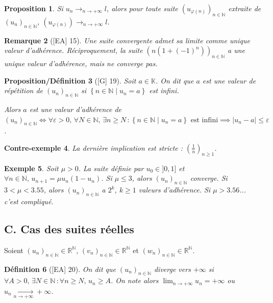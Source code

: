 \documentclass[10pt, a4paper, parskip=full, twoside, twocolumn]{report}
\newtheorem{definition}{Définition}
\newtheorem{proposition}[definition]{Proposition}
\newtheorem{proposition_def}[definition]{Proposition/Définition}
\newtheorem{example}[definition]{Exemple}
\newtheorem{cexample}[definition]{Contre-exemple}
\newtheorem{remark}[definition]{Remarque}
\newcommand{\IN}{\mathbb{N}}
\newcommand{\IK}{\mathbb{K}}
\newcommand{\IR}{\mathbb{R}}
\begin{document}
\begin{proposition}
	Si $u_n\longrightarrow_{n\to +\infty} l$, alors pour toute suite $\left(u_{\varphi(n)}\right)_{n\in\IN}$ extraite de $\left(u_n\right)_{n\in\IN}$, $\left(u_{\varphi(n)}\right)\longrightarrow_{n\to +\infty} l$.
\end{proposition}

\begin{remark}[\textnormal{[EA] 15}]
	Une suite convergente admet sa limite comme unique valeur d'adhérence. Réciproquement,
	la suite $\left(n(1+(-1)^n)\right)_{n\in\IN}$ a une unique valeur d'adhérence, mais ne converge pas.
\end{remark}

\begin{proposition_def}[\textnormal{[G] 19}]
	Soit $a\in\IK$. On dit que $a$ est \emph{une valeur de répétition de $\left(u_n\right)_{n\in \IN}$} si $\left\{n\in \IN \mid u_n = a\right\}$ est infini.
	
	Alors $a$ est une valeur d'adhérence de $\left(u_n\right)_{n\in\IN}\iff \forall \varepsilon > 0,\,\forall N\in\IN,\, \exists n\geq N\,\colon \left\{n\in\IN\mid u_n=a\right\}\text{ est infini}\implies\vert u_n - a\vert \leq \varepsilon$.
\end{proposition_def}

\begin{cexample}
	La dernière implication est stricte : $\left(\frac{1}{n}\right)_{n\geq 1}$.
\end{cexample}

\begin{example}
	Soit $\mu > 0$. La suite définie par $u_0\in]0,1]$ et $\forall n\in\IN,\, u_{n+1} = \mu u_n(1-u_n)$.
	Si $\mu \leq 3$, alors $\left(u_n\right)_{n\in\IN}$ converge. Si $3 < \mu < 3.55$, alors $\left(u_n\right)_{n\in\IN}$ a $2^k$, $k\geq 1$ valeurs d'adhérence. Si $\mu > 3.56$... c'est compliqué.
\end{example}

\subsection*{C. Cas des suites réelles}

\textcolor{paragraphtext}{Soient $\left(u_n\right)_{n\in\IN}\in\IR^{\IN}$, $\left(v_n\right)_{n\in\IN}\in\IR^{\IN}$ et $\left(w_n\right)_{n\in\IN}\in\IR^{\IN}$.}

\begin{definition}[\textnormal{[EA] 20}]
	On dit que $\left(u_n\right)_{n\in\IN}$ \emph{diverge vers $+\infty$} si $\forall A > 0,\,\exists N\in\IN\,\colon \forall n\geq N,\, u_n \geq A$.
	On note alors $\displaystyle{\lim_{n\to +\infty} u_n = +\infty}$ ou $u_n\xrightarrow[n\to +\infty]{}+\infty$.
\end{definition}
\end{document}
